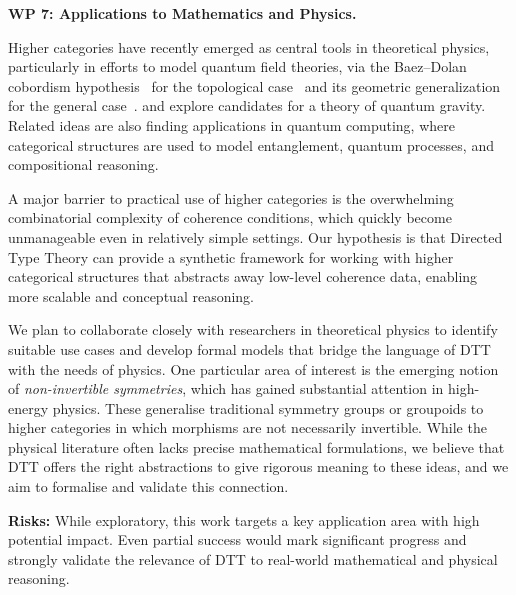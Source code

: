 \documentclass[a4paper,11pt]{article}
\renewcommand{\paragraph}[1]{\textbf{#1.}}
\begin{document}

\paragraph{WP 7: Applications to Mathematics and Physics}

Higher categories have recently emerged as central tools in
theoretical physics, particularly in efforts to model quantum field
theories, via the Baez--Dolan cobordism hypothesis~\cite{baez-dolan}
for the topological case~\cite{lurie-tft}
and its geometric generalization for the general case~\cite{grady-pavlov}.
and explore candidates for a theory of quantum
gravity. Related ideas are also finding applications in quantum
computing, where categorical structures are used to model
entanglement, quantum processes, and compositional reasoning.

A major barrier to practical use of higher categories is the
overwhelming combinatorial complexity of coherence conditions, which
quickly become unmanageable even in relatively simple settings. Our
hypothesis is that Directed Type Theory can provide a synthetic
framework for working with higher categorical structures that
abstracts away low-level coherence data, enabling more scalable and
conceptual reasoning.

We plan to collaborate closely with researchers in theoretical physics
to identify suitable use cases and develop formal models that bridge
the language of DTT with the needs of physics. One particular area of
interest is the emerging notion of \emph{non-invertible symmetries},
which has gained substantial attention in high-energy physics. These
generalise traditional symmetry groups or groupoids to higher
categories in which morphisms are not necessarily invertible. While
the physical literature often lacks precise mathematical formulations,
we believe that DTT offers the right abstractions to give rigorous
meaning to these ideas, and we aim to formalise and validate this
connection.

\textbf{Risks:} While exploratory, this work targets a key application
area with high potential impact. Even partial success would mark
significant progress and strongly validate the relevance of DTT to
real-world mathematical and physical reasoning.
\end{document}

